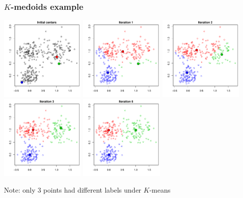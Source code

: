 \documentclass[mathserif]{beamer}
\begin{document}
\begin{frame}
\frametitle{$K$-medoids example}
\begin{center}
\includegraphics[width=0.31\textwidth]{figures/kmed0.pdf}
\hspace{3pt}
\includegraphics[width=0.31\textwidth]{figures/kmed1.pdf} 
\hspace{3pt}
\includegraphics[width=0.31\textwidth]{figures/kmed2.pdf} \\
\smallskip
\includegraphics[width=0.31\textwidth]{figures/kmed3.pdf} 
\hspace{3pt}
\includegraphics[width=0.31\textwidth]{figures/kmed6.pdf} 
\end{center}

\smallskip
Note: only 3 points had different labels under $K$-means
\end{frame}
\end{document}
